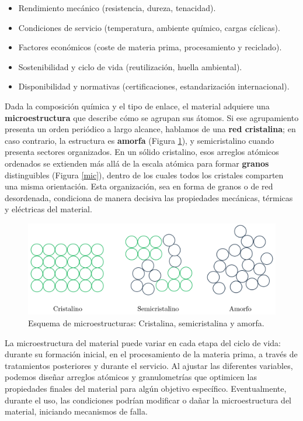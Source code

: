\begin{itemize}
    \item Rendimiento mecánico (resistencia, dureza, tenacidad).
    \item Condiciones de servicio (temperatura, ambiente químico, cargas cíclicas).
    \item Factores económicos (coste de materia prima, procesamiento y reciclado).
    \item  Sostenibilidad y ciclo de vida (reutilización, huella ambiental).
    \item Disponibilidad y normativas (certificaciones, estandarización internacional).
\end{itemize}

Dada la composición química y el tipo de enlace, el material adquiere una \textbf{microestructura} que describe cómo se agrupan sus átomos. Si ese agrupamiento presenta un orden periódico a largo alcance, hablamos de una \textbf{red cristalina}; en caso contrario, la estructura es \textbf{amorfa} (Figura \ref{cris}), y semicristalino cuando presenta sectores organizados. En un sólido cristalino, esos arreglos atómicos ordenados se extienden más allá de la escala atómica para formar \textbf{granos} distinguibles (Figura \ref{mic}), dentro de los cuales todos los cristales comparten una misma orientación. Esta organización, sea en forma de granos o de red desordenada, condiciona de manera decisiva las propiedades mecánicas, térmicas y eléctricas del material.

\begin{figure}[h!]
    \centering
    \includegraphics[width=0.9\linewidth]{imgs/crist.png}
    \caption{Esquema de microestructuras: Cristalina, semicristalina y amorfa.}
    \label{cris}
\end{figure}

La microestructura del material puede variar en cada etapa del ciclo de vida: durante su formación inicial, en el procesamiento de la materia prima, a través de tratamientos posteriores y durante el servicio. Al ajustar las diferentes variables, podemos diseñar arreglos atómicos y granulometrías que optimicen las propiedades finales del material para algún objetivo específico. Eventualmente, durante el uso, las condiciones podrían modificar o dañar la microestructura del material, iniciando mecanismos de falla.

